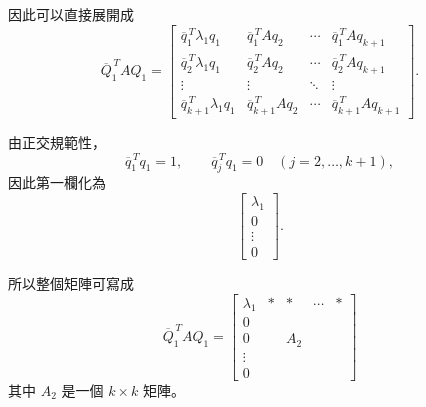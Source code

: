 \documentclass[12pt,a4paper]{article}
\begin{document}
因此可以直接展開成
\[
    \overline{Q}_1^{\,T}AQ_1
    =
    \left[
        \begin{array}{cccc}
            \overline{q}_1^{\,T}\lambda_1q_1
                   &
            \overline{q}_1^{\,T}Aq_2
                   &
            \cdots
                   &
            \overline{q}_1^{\,T}Aq_{k+1}
            \\[5pt]
            \overline{q}_2^{\,T}\lambda_1q_1
                   &
            \overline{q}_2^{\,T}Aq_2
                   &
            \cdots
                   &
            \overline{q}_2^{\,T}Aq_{k+1}
            \\[5pt]
            \vdots & \vdots & \ddots & \vdots
            \\[5pt]
            \overline{q}_{k+1}^{\,T}\lambda_1q_1
                   &
            \overline{q}_{k+1}^{\,T}Aq_2
                   &
            \cdots
                   &
            \overline{q}_{k+1}^{\,T}Aq_{k+1}
        \end{array}
        \right].
\]

由正交規範性，
\[
    \overline{q}_1^{\,T}q_1=1,
    \qquad
    \overline{q}_j^{\,T}q_1=0
    \quad(j=2,\ldots,k+1),
\]
因此第一欄化為
\[
    \left[
        \begin{array}{c}
            \lambda_1 \\[4pt]
            0         \\[4pt]
            \vdots    \\[4pt]
            0
        \end{array}
        \right].
\]

所以整個矩陣可寫成
\[
    \boxed{
        \overline{Q}_1^{\,T}AQ_1
        =
        \left[
            \begin{array}{ccccc}
                \lambda_1
                 &
                *
                 &
                *
                 &
                \cdots
                 &
                *
                \\[5pt]
                0
                 &
                 &
                 &
                 &
                \\[-3pt]
                0
                 &
                 &
                A_2
                 &
                 &
                \\[-3pt]
                \vdots
                 &
                 &
                 &
                 &
                \\[-3pt]
                0
                 &
                 &
                 &
                 &
            \end{array}
            \right]
    }
\]
其中 $A_2$ 是一個 $k\times k$ 矩陣。
\end{document}
